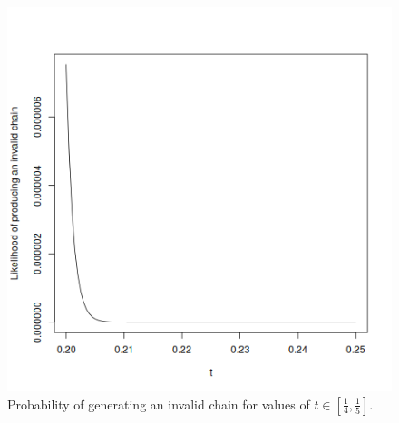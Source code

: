\documentclass[11pt,a4paper]{article}
\begin{document}
\begin{appendices}
  \begin{figure}[ht]
    \begin{center}
      \includegraphics[scale=0.5]{calculating-t.png}
    \end{center}
    \caption{Probability of generating an invalid chain for values of $t\in\left[
        \frac{1}{4}, \frac{1}{5} \right]$.}
    \label{fig:calculating-t}
  \end{figure}

\end{appendices}
\end{document}
